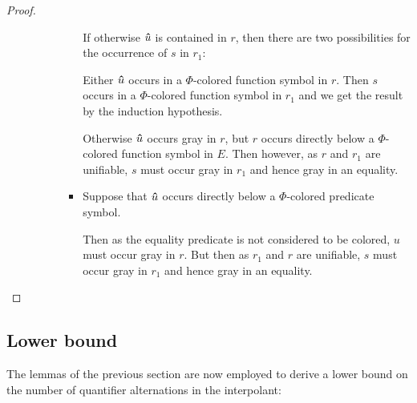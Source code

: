 \begin{proof}
\begin{itemize}
\begin{itemize}
\begin{itemize}
\begin{itemize}
									If otherwise $\bm\hat u$ is contained in $r$, 
									then there are two possibilities for the occurrence of $s$ in $r_1$:

									Either $\bm\hat u$ occurs in a $\Phi$-colored function symbol in $r$. Then $s$ occurs in a $\Phi$-colored function symbol in $r_1$ and we get the result by the induction hypothesis.

									Otherwise $\bm\hat u$ occurs gray in $r$, but $r$ occurs directly below a $\Phi$-colored function symbol in $E$.
									Then however, as $r$ and $r_1$ are unifiable, $s$ must occur gray in $r_1$ and hence gray in an equality.

								\item
									Suppose that $\bm\hat u$ occurs directly below a $\Phi$-colored predicate symbol. 

									Then as the equality predicate is not considered to be colored, $u$ must occur gray in $r$.
									But then as $r_1$ and $r$ are unifiable, $s$ must occur gray in $r_1$ and hence gray in an equality.
									\qedhere
							\end{itemize}

					\end{itemize}

			\end{itemize}

	\end{itemize}


\end{proof}

\subsection{Lower bound}

The lemmas of the previous section are now employed to derive a lower bound on the number of quantifier alternations in the interpolant:


